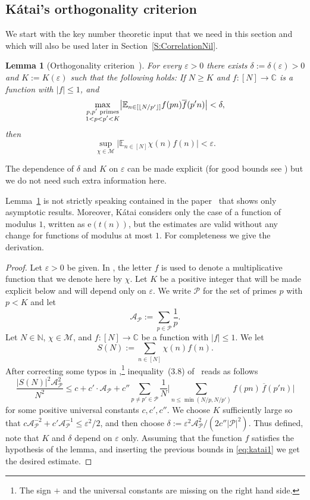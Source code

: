 \documentclass[11pt]{amsart}
\newtheorem{lemma}{Lemma}[section]
\theoremstyle{definition}
\begin{document}
\subsection{K\'atai's orthogonality criterion}
\label{subsec:katai} We start with the key number theoretic input
that we need in this section and which will also be used later in Section~\ref{S:CorrelationNil}.
\begin{lemma}[Orthogonality criterion~\cite{K86}]
\label{lem:katai} For every ${\varepsilon}>0$ 
there exists
$\delta:=\delta({\varepsilon})>0$ and $K:=K({\varepsilon})$ such that the
following holds: If $N\geq K$  and $f\colon [N]\to {{\mathbb C}}$ is a function with
$|f|\leq 1$, and
$$
\max_{\substack{p,p'\text{ \rm primes}\\1<p<p'<K}}\bigl|{{\mathbb E}}_{n\in[\lfloor
N/p'\rfloor]} f(pn)\overline{f}(p'n)\bigr|< \delta,
$$
 then
$$
\sup_{\chi\in{{\mathcal M}}}\bigl|{{\mathbb E}}_{n\in[N]}\chi(n)f(n)\bigr|<{\varepsilon}.
$$
\end{lemma}
The dependence of $\delta$ and $K$ on ${\varepsilon}$ can be made
explicit (for good bounds see \cite{BSZ12}) but we do not need such extra information
here.

Lemma~\ref{lem:katai} is not strictly speaking contained in the
paper~\cite{K86} that shows only  asymptotic results. Moreover,
K\'atai considers only the case of a function of modulus $1$,
written as ${\mathrm{e}}(t(n))$, but the estimates are valid without any
change for functions of modulus at most $1$. For
completeness we give the derivation.

\begin{proof}
 Let  ${\varepsilon}>0$ be given.
In \cite{K86}, the  letter $f$ is used to denote a multiplicative
function that we denote here by  $\chi$. Let $K$  be a
positive integer that will be made explicit below and will depend
only on ${\varepsilon}$. We write ${{\mathcal P}}$ for  the set of primes $p$ with
$p<K$ and let
$$
{{\mathcal A}}_{{\mathcal P}}:=\sum_{p\in{{\mathcal P}}}\frac 1p.
$$
Let $N\in {{\mathbb N}}$,  $\chi\in{{\mathcal M}}$,  and $f:[N]\to {{\mathbb C}}$ be a function with $|f|\leq 1$. We let
$$
S(N):=\sum_{n\in[N]} \chi(n)f(n).
$$
After correcting some typos in \cite{K86},\footnote{The sign $+$ and
the universal constants  are missing on the right hand side.}
 inequality~(3.8) of~\cite{K86} reads as follows
\begin{equation}
\label{eq:katai1} \frac{|S(N)|^2{{\mathcal A}}_{{\mathcal P}}^2}{N^2}\leq c+ c'\cdot
{{\mathcal A}}_{{\mathcal P}}+ c''\sum_{p\neq p'\in{{\mathcal P}}}\frac 1N \Big|\sum_{n\leq
\min(N/p,N/p')}f(pn)\,\overline{f}(p'n)\Big|
\end{equation}
for some positive universal constants $c,c',c''$. We choose $K$ sufficiently large  so that
$c{{\mathcal A}}_{{\mathcal P}}^{-2}+c'{{\mathcal A}}_{{\mathcal P}}^{-1}\leq {\varepsilon}^2/2$, and then choose
$\delta:= {\varepsilon}^2{{\mathcal A}}_{{\mathcal P}}^2/(2c'' |{{\mathcal P}}|^2)$. Thus defined, note that
$K$ and $\delta$ depend on ${\varepsilon}$ only.
 Assuming that the function $f$
satisfies the hypothesis of the lemma, and inserting the previous bounds in
\eqref{eq:katai1} we get the desired estimate.
 \end{proof}
\end{document}
